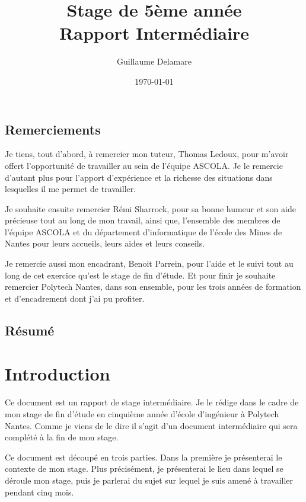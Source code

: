 \documentclass[a4paper, 11pt]{report}
\title{Stage de 5ème année\\ \large Rapport Intermédiaire}
\author{Guillaume Delamare}
\date{\today}
\begin{document}
\renewcommand{\labelitemi}{$\bullet$}
\renewcommand{\labelitemii}{$\diamond$}
\renewcommand{\labelitemiii}{$\ast$}
\renewcommand{\labelitemiv}{$\cdot$}

\maketitle

\section*{Remerciements}
Je tiens, tout d'abord, à remercier mon tuteur, Thomas Ledoux, pour m'avoir offert l'opportunité de travailler au sein de l'équipe ASCOLA. Je le remercie d'autant plus pour l'apport d'expérience et la richesse des situations dans lesquelles il me permet de travailler.

Je souhaite ensuite remercier Rémi Sharrock, pour sa bonne humeur et son aide précieuse tout au long de mon travail, ainsi que, l'ensemble des membres de l'équipe ASCOLA et du département d'informatique de l'école des Mines de Nantes pour leurs accueils, leurs aides et leurs conseils.

Je remercie aussi mon encadrant, Benoit Parrein, pour l'aide et le suivi tout au long de cet exercice qu'est le stage de fin d'étude. Et pour finir je souhaite remercier Polytech Nantes, dans son ensemble, pour les trois années de formation et d'encadrement dont j'ai pu profiter.

\newpage

\section*{Résumé}

\newpage

\tableofcontents

\chapter{Introduction}
Ce document est un rapport de stage intermédiaire. Je le rédige dans le cadre de mon stage de fin d'étude en cinquième année d'école d'ingénieur à Polytech Nantes. Comme je viens de le dire il s'agit d'un document intermédiaire qui sera complété à la fin de mon stage. 

Ce document est découpé en trois parties. Dans la première je présenterai le contexte de mon stage. Plus précisément, je présenterai le lieu dans lequel se déroule mon stage, puis je parlerai du sujet sur lequel je suis amené à travailler pendant cinq mois.
\end{document}
